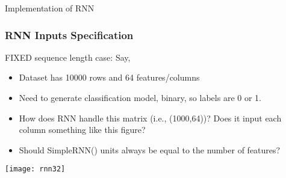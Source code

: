 

\begin{frame}
  \begin{center}
    {\Large Implementation of RNN}
  \end{center}
\end{frame}

\begin{frame}[fragile] \frametitle{RNN Inputs Specification}
FIXED sequence length case: Say,
\begin{itemize}
\item Dataset has 10000 rows and 64 features/columns
\item Need to generate classification model, binary, so labels are 0 or 1.
\item How does RNN handle this matrix (i.e., (1000,64))? Does it input each column something like this figure?
\item Should SimpleRNN() units always be equal to the number of features?
\end{itemize}

\begin{center}
\texttt{[image: rnn32]}
\end{center}


\end{frame}

